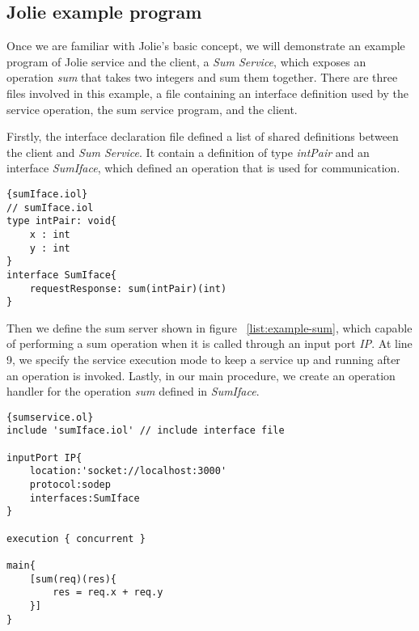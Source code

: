 \subsection{Jolie example program}

Once we are familiar with Jolie's basic concept, we will demonstrate an example program of Jolie service and the client, a \textit{Sum Service}, which exposes an operation \textit{sum} that takes two integers and sum them together. There are three files involved in this example, a file containing an interface definition used by the service operation, the sum service program, and the client.

Firstly, the interface declaration file defined a list of shared definitions between the client and \textit{Sum Service}. It contain a definition of type \textit{intPair} and an interface \textit{SumIface}, which defined an operation that is used for communication.

\begin{listing}[ht]
    \lstset{language=Jolie,
        style=codeStyle
    }
    \begin{lstlisting}[frame=tlrb,caption={Sum service interface}, basicstyle=\footnotesize, label={list:example-iol}]{sumIface.iol}
// sumIface.iol
type intPair: void{
    x : int
    y : int
}
interface SumIface{
    requestResponse: sum(intPair)(int)
}
\end{lstlisting}
\end{listing}

Then we define the sum server shown in figure ~\ref{list:example-sum}, which capable of performing a sum operation when it is called through an input port \textit{IP}. At line 9, we specify the service execution mode to keep a service up and running after an operation is invoked. Lastly, in our main procedure, we create an operation handler for the operation \textit{sum} defined in \textit{SumIface}.

\begin{listing}[ht]
    \lstset{language=Jolie,
        style=codeStyle,
        numbers=left,
        firstnumber=1
    }
    \begin{lstlisting}[frame=tlrb,basicstyle=\footnotesize, caption= {Sum service}, label={list:example-sum} ]{sumservice.ol}
include 'sumIface.iol' // include interface file

inputPort IP{
    location:'socket://localhost:3000'
    protocol:sodep 
    interfaces:SumIface
}

execution { concurrent }

main{
    [sum(req)(res){
        res = req.x + req.y
    }]
}
\end{lstlisting}
\end{listing}

